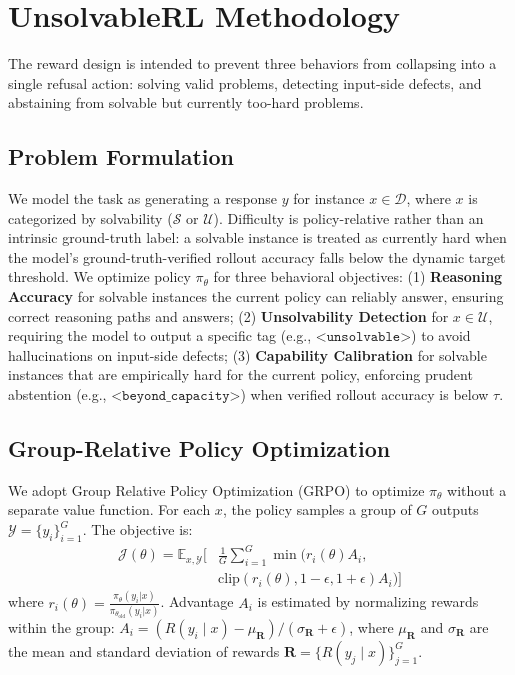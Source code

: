 \section{UnsolvableRL Methodology}

The reward design is intended to prevent three behaviors from collapsing into a single refusal action: solving valid problems, detecting input-side defects, and abstaining from solvable but currently too-hard problems.


\subsection{Problem Formulation}
We model the task as generating a response $y$ for instance $x \in \mathcal{D}$, where $x$ is categorized by solvability ($\mathcal{S}$ or $\mathcal{U}$). Difficulty is policy-relative rather than an intrinsic ground-truth label: a solvable instance is treated as currently hard when the model's ground-truth-verified rollout accuracy falls below the dynamic target threshold. We optimize policy $\pi_\theta$ for three behavioral objectives:
(1) \textbf{Reasoning Accuracy} for solvable instances the current policy can reliably answer, ensuring correct reasoning paths and answers; 
(2) \textbf{Unsolvability Detection} for $x \in \mathcal{U}$, requiring the model to output a specific tag (e.g., $\texttt{<unsolvable>}$) to avoid hallucinations on input-side defects; 
(3) \textbf{Capability Calibration} for solvable instances that are empirically hard for the current policy, enforcing prudent abstention (e.g., $\texttt{<beyond\_capacity>}$) when verified rollout accuracy is below $\tau$.

\subsection{Group-Relative Policy Optimization}
We adopt Group Relative Policy Optimization (GRPO) to optimize $\pi_\theta$ without a separate value function. For each $x$, the policy samples a group of $G$ outputs $\mathcal{Y} = \{y_i\}_{i=1}^G$. The objective is:
\begin{equation}
\begin{aligned}
\mathcal{J}(\theta) = \mathbb{E}_{x, \mathcal{Y}} \bigg[ & \frac{1}{G} \sum_{i=1}^{G} \min \Big( r_i(\theta) A_i, \\
& \text{clip}(r_i(\theta), 1-\epsilon, 1+\epsilon) A_i \Big) \bigg]
\end{aligned}
\label{eq:grpo_obj}
\end{equation}
where $r_i(\theta) = \frac{\pi_\theta(y_i|x)}{\pi_{\theta_{\text{old}}}(y_i|x)}$. Advantage $A_i$ is estimated by normalizing rewards within the group: $A_i = (R(y_i \mid x) - \mu_{\mathbf{R}}) / (\sigma_{\mathbf{R}} + \epsilon)$, where $\mu_{\mathbf{R}}$ and $\sigma_{\mathbf{R}}$ are the mean and standard deviation of rewards $\mathbf{R}=\{R(y_j \mid x)\}_{j=1}^G$.